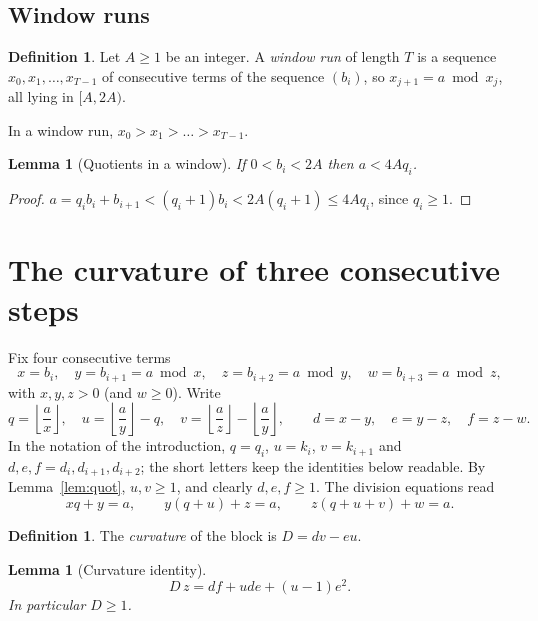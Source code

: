 \documentclass[11pt]{article}
\newtheorem{lemma}[theorem]{Lemma}
\theoremstyle{definition}
\newtheorem{definition}[theorem]{Definition}
\theoremstyle{remark}
\begin{document}
\subsection{Window runs}

\begin{definition}
Let $A\ge1$ be an integer. A \emph{window run} of length $T$ is a sequence $x_0,x_1,\dots,x_{T-1}$ of
consecutive terms of the sequence $(b_i)$, so $x_{j+1}=a\bmod x_j$, all lying in $[A,2A)$.
\end{definition}

In a window run, $x_0>x_1>\dots>x_{T-1}$.

\begin{lemma}[Quotients in a window]\label{lem:fourAq}
If $0<b_i<2A$ then $a<4Aq_i$.
\end{lemma}

\begin{proof}
$a=q_ib_i+b_{i+1}<(q_i+1)b_i<2A(q_i+1)\le4Aq_i$, since $q_i\ge1$.
\end{proof}

\section{The curvature of three consecutive steps}\label{sec:curv}

Fix four consecutive terms
\[
x=b_i,\quad y=b_{i+1}=a\bmod x,\quad z=b_{i+2}=a\bmod y,\quad w=b_{i+3}=a\bmod z,
\]
with $x,y,z>0$ (and $w\ge0$). Write
\[
q=\left\lfloor \frac ax\right\rfloor,\quad
u=\left\lfloor \frac ay\right\rfloor-q,\quad
v=\left\lfloor \frac az\right\rfloor-\left\lfloor \frac ay\right\rfloor,\qquad
d=x-y,\quad e=y-z,\quad f=z-w .
\]
In the notation of the introduction, $q=q_i$, $u=k_i$, $v=k_{i+1}$ and
$d,e,f=d_i,d_{i+1},d_{i+2}$; the short letters keep the identities below
readable. By Lemma~\ref{lem:quot}, $u,v\ge1$, and clearly $d,e,f\ge1$. The division equations read
\begin{equation}\label{eq:div}
xq+y=a,\qquad y(q+u)+z=a,\qquad z(q+u+v)+w=a .
\end{equation}

\begin{definition}
The \emph{curvature} of the block is $D=dv-eu$.
\end{definition}

\begin{lemma}[Curvature identity]\label{lem:curv}
\[
D\,z=df+ude+(u-1)e^2 .
\]
In particular $D\ge1$.
\end{lemma}
\end{document}
